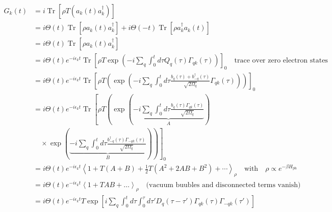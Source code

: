 \begin{align}
    G_k(t) &= i \operatorname{Tr}\left[\rho T\left(a_k(t) a_k^\dagger\right)\right] \\
&= i \Theta(t) \operatorname{Tr}\left[\rho a_k(t) a_k^\dagger\right] + i \Theta(-t) \operatorname{Tr}\left[\rho a_k^\dagger a_k(t)\right] \\
&= i \Theta(t) \operatorname{Tr}\left[\rho a_k(t) a_k^\dagger\right] \\
&= i \Theta(t) e^{-i \epsilon_k t} \operatorname{Tr}\left[\rho T \exp \left(-i \sum_q \int_0^t d \tau Q_q(\tau) \Gamma_{q k}(\tau)\right)\right]_0 \quad \text{trace over zero electron states} \\
&= i \Theta(t) e^{-i \epsilon_k t} \operatorname{Tr}\left[\rho T \left(\exp \left(-i \sum_q \int_0^t d \tau \frac{b_q (\tau) + b_{-q}^\dagger (\tau)}{\sqrt{2 \Omega_q}} \Gamma_{q k}(\tau)\right)\right)\right]_0 \\
&= i \Theta(t) e^{-i \epsilon_k t} \operatorname{Tr}\left[\rho T \left(\exp \left(\underbrace{-i \sum_q \int_0^t d \tau \frac{b_q(\tau) \Gamma_{q k}(\tau)}{\sqrt{2 \Omega_q}}}_{A}\right)\right.\right. \\
&\left.\left.\quad \times \exp \left(\underbrace{-i \sum_q \int_0^t d \tau \frac{b_{-q}^\dagger(\tau) \Gamma_{-q k}(\tau)}{\sqrt{2 \Omega_q}}}_{B}\right)\right)\right]_0  \\
&= i \Theta(t) e^{-i \epsilon_k t} \left\langle 1 +T(A+B) + \frac{1}{2} T(A^2 + 2AB + B^2) + \cdots \right\rangle_\rho \quad \text{with} \quad \rho \propto e^{-\beta H_{\text{ph}}}  \\
&= i \Theta(t) e^{-i \epsilon_k t} \left\langle 1+T AB + \ldots \right\rangle_\rho \quad \text{(vacuum buubles and disconnected terms vanish)} \label{ce:exp} \\
&= i \Theta(t) e^{-i \epsilon_k t} T \exp \left[ i \sum_q \int_0^t d \tau \int_0^\tau d \tau' D_q(\tau - \tau') \Gamma_{q k}(\tau) \Gamma_{-q k}(\tau') \right] \label{final_ce}
\end{align}
